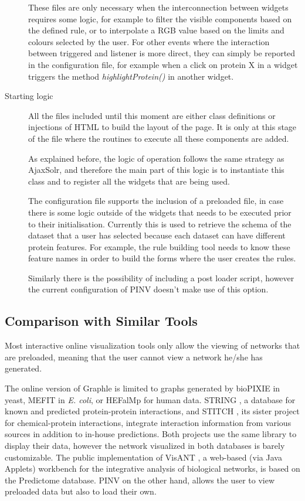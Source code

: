 \begin{description}
These files are only necessary when the interconnection between widgets requires some logic, for example to filter the visible components based on the defined rule, or to interpolate a RGB value based on the limits and colours selected by the user. For other events where the interaction between triggered and listener is more direct, they can simply be reported in the configuration file, for example when a click on protein X in a widget triggers the method \emph{highlightProtein()} in another widget.

\item[Starting logic]
All the files included until this moment are either class definitions or injections of HTML to build the layout of the page. It is only at this stage of the file where the routines to execute all these components are added. 

As explained before, the logic of operation follows the same strategy as AjaxSolr, and therefore the main part of this logic is to instantiate this class and to register all the widgets that are being used.

The configuration file supports the inclusion of a preloaded file, in case there is some logic outside of the widgets that needs to be executed prior to their initialisation. Currently this is used to retrieve the schema of the dataset that a user has selected because each dataset can have different protein features. For example, the rule building tool needs to know these feature names in order to build the forms where the user creates the rules.

Similarly there is the possibility of including a post loader script, however the current configuration of PINV doesn't make use of this option.
\end{description}


\subsection{Comparison with Similar Tools}
Most interactive online visualization tools only allow the viewing of networks that are preloaded, meaning that the user cannot view a network he/she has generated.

The online version of Graphle \cite{HUT2009} is limited to graphs generated by bioPIXIE in yeast, MEFIT in \emph{E. coli}, or HEFalMp for human data. STRING \cite{FRA2013}, a database for known and predicted protein-protein interactions, and STITCH \cite{KUH2008}, its sister project for chemical-protein interactions, integrate interaction information from various sources in addition to in-house predictions. Both projects use the same library to display their data, however the network visualized in both databases is barely customizable. The public implementation of VisANT \cite{HU2013}, a web-based  (via Java Applets) workbench for the integrative analysis of biological networks, is based on the Predictome database.  
PINV on the other hand, allows the user to view preloaded data but also to load their own.

